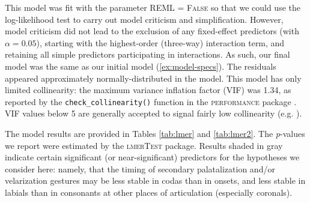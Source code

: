 \documentclass[output=paper,colorlinks,citecolor=brown]{langscibook}
\begin{document}
This model was fit with the parameter \textsc{REML = False} so that we could use the log-likelihood test to carry out model criticism and simplification. However, model criticism did not lead to the exclusion of any fixed-effect predictors (with $\alpha = 0.05$), starting with the highest-order (three-way) interaction term, and retaining all simple predictors participating in interactions. As such, our final model was the same as our initial model (\ref{ex:model-specs}). The residuals appeared approximately normally-distributed in the model. This model has only limited collinearity: the maximum variance inflation factor (VIF) was 1.34, as reported by the \texttt{check\_collinearity()} function in the \textsc{performance} package \citep{performancePackage}. VIF values below 5 are generally accepted to signal fairly low collinearity (e.g. \citealt{Tomaschek_etal2018_collinearity}).

The model results are provided in Tables \ref{tab:lmer} and \ref{tab:lmer2}. The \emph{p}-values we report were estimated by the \textsc{lmerTest} package. Results shaded in gray indicate certain significant (or near-significant) predictors for the hypotheses we consider here: namely, that the timing of secondary palatalization and/or velarization gestures may be less stable in codas than in onsets, and less stable in labials than in consonants at other places of articulation (especially coronals).

%
%
%

\end{document}
